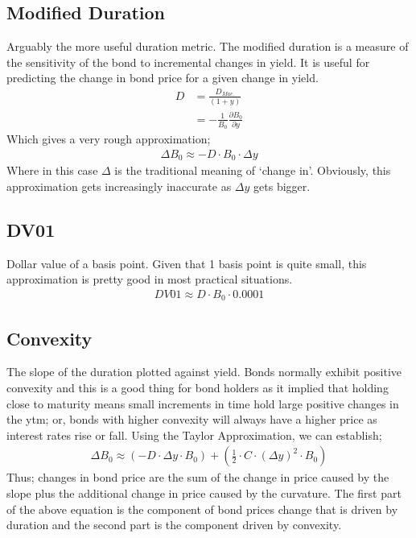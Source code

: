 \documentclass[a4paper]{article}
\begin{document}
\subsection{Modified Duration}
Arguably the more useful duration metric. The modified duration is a measure
of the sensitivity of the bond to incremental changes in yield. It is useful
for predicting the change in bond price for a given change in yield.
\begin{align*}
D &= \frac{D_{Mac.}}{(1 + y)} \\
&= - \frac{1}{B_0} \frac{\partial B_0}{\partial y}
\end{align*}
Which gives a very rough approximation;
\begin{align*}
\Delta B_0 \approx - D \cdot B_0 \cdot \Delta y
\end{align*}
Where in this case $\Delta$ is the traditional meaning of `change in'.
Obviously, this approximation gets increasingly inaccurate  as $\Delta y$
gets bigger.
\subsection{DV01}
Dollar value of a basis point. Given that 1 basis point is quite small, this
approximation is pretty good in most practical situations.
\begin{align*}
DV01 \approx D \cdot B_0 \cdot 0.0001
\end{align*}

\subsection{Convexity}
The slope of the duration plotted against yield. Bonds normally exhibit positive
convexity and this is a good thing for bond holders as it implied that holding
close to maturity means small increments in time hold large positive changes
in the ytm; or, bonds with higher convexity will always have a higher price
as interest rates rise or fall. Using the Taylor Approximation, we can
establish;
\begin{align*}
\Delta B_0 \approx (-D \cdot \Delta y \cdot B_0) + (\frac{1}{2}\cdot C
\cdot (\Delta y)^2 \cdot B_0)
\end{align*}
Thus; changes in bond price are the sum of the change in price caused by the slope
plus the additional change in price caused by the curvature. The first part of
the above equation is the component of bond prices change that is driven by
duration and the second part is the component driven by convexity.
\end{document}
